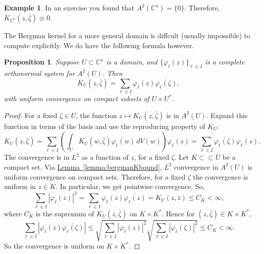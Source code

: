 \documentclass[12pt,openany]{book}
\newcommand{\abs}[1]{\left\lvert {#1} \right\rvert}
\newcommand{\C}{{\mathbb{C}}}
\theoremstyle{plain}
\newtheorem{prop}[thm]{Proposition}
\theoremstyle{remark}
\theoremstyle{definition}
\theoremstyle{exercise}
\theoremstyle{example}
\newtheorem{example}[thm]{Example}
\newcommand{\lemmaref}[1]{\hyperref[#1]{Lemma~\ref*{#1}}}
\begin{document}
\begin{example}
In an exercise you found that
$A^2(\C^n) = \{ 0 \}$.  Therefore,
$K_{\C^n}(z,\bar{\zeta}) \equiv 0$.
\end{example}

The Bergman kernel for a more general domain is diffcult (usually impossible)
to compute explicitly.  We do have the following formula however.

\begin{prop}
Suppose $U \subset \C^n$ is a domain, and
$\{ \varphi_\ell (z) \}_{\ell\in I}$ is a complete orthonormal system
for $A^2(U)$.  Then
\begin{equation*}
K_U(z,\bar{\zeta})
=
\sum_{\ell \in I} \varphi_\ell(z) \overline{\varphi_\ell(\zeta)} ,
\end{equation*}
with uniform convergence on compact subsets of $U \times U^*$.
\end{prop}

\begin{proof}
For a fixed $\zeta \in U$, the function $z \mapsto K_U(z,\bar{\zeta})$ is
in $A^2(U)$.
Expand this function
in terms of the basis and use the reproducing property of $K_U$:
\begin{equation*}
K_U(z,\bar{\zeta}) =
\sum_{\ell \in I}
\left(\int_U K_U(w,\bar{\zeta}) \overline{\varphi_\ell(w)} \, dV(w) \right)
\varphi_\ell(z)
=
\sum_{\ell \in I}
\overline{\varphi_\ell(\zeta)}
\varphi_\ell(z) .
\end{equation*}
The convergence is in $L^2$ as a function of $z$, for a fixed $\zeta$.
Let $K \subset \subset U$ be a compact set.
Via \lemmaref{lemma:bergmanKbound}, $L^2$ convergence in $A^2(U)$ is uniform convergence on
compact sets.  Therefore, for a fixed $\zeta$ the convergence is uniform in
$z \in K$.  In particular, we get pointwise convergence.  So,
\begin{equation*}
\sum_{\ell \in I}
\abs{
\varphi_\ell(z)
}^2
=
\sum_{\ell \in I}
\varphi_\ell(z)
\overline{\varphi_\ell(z)}
=
K_U(z,\bar{z})
\leq C_K < \infty ,
\end{equation*}
where $C_K$ is the supremum of $K_U(z,\bar{\zeta})$ on $K \times K^*$.
Hence for $(z,\bar{\zeta}) \in K \times K^*$,
\begin{equation*}
\sum_{\ell \in I}
\abs{
\varphi_\ell(z)
\overline{\varphi_\ell(\zeta)}
}
\leq
\sqrt{
\sum_{\ell \in I}
\abs{
\varphi_\ell(z)
}^2
}
\sqrt{
\sum_{\ell \in I}
\abs{
\varphi_\ell(\zeta)
}^2
}
\leq
C_K < \infty .
\end{equation*}
So the convergence is uniform on $K \times K^*$.
\end{proof}
\end{document}
